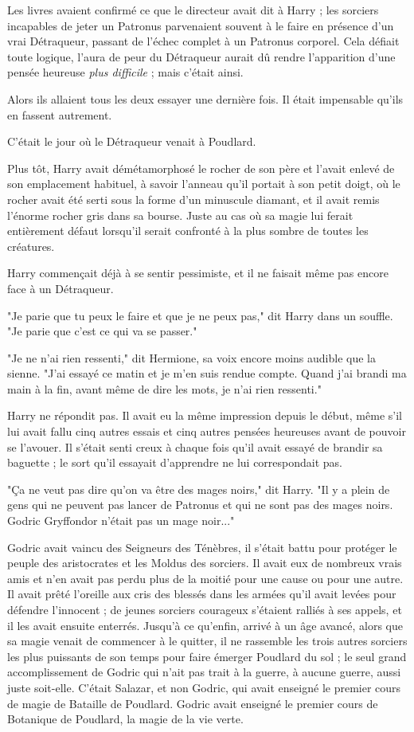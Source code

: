 Les livres avaient confirmé ce que le directeur avait dit à Harry ; les sorciers incapables de jeter un Patronus parvenaient souvent à le faire en présence d'un vrai Détraqueur, passant de l'échec complet à un Patronus corporel. Cela défiait toute logique, l'aura de peur du Détraqueur aurait dû rendre l'apparition d'une pensée heureuse \emph{plus difficile}  ; mais c'était ainsi.

Alors ils allaient tous les deux essayer une dernière fois. Il était impensable qu'ils en fassent autrement.

C'était le jour où le Détraqueur venait à Poudlard.

Plus tôt, Harry avait démétamorphosé le rocher de son père et l'avait enlevé de son emplacement habituel, à savoir l'anneau qu'il portait à son petit doigt, où le rocher avait été serti sous la forme d'un minuscule diamant, et il avait remis l'énorme rocher gris dans sa bourse. Juste au cas où sa magie lui ferait entièrement défaut lorsqu'il serait confronté à la plus sombre de toutes les créatures.

Harry commençait déjà à se sentir pessimiste, et il ne faisait même pas encore face à un Détraqueur.

"Je parie que tu peux le faire et que je ne peux pas," dit Harry dans un souffle. "Je parie que c'est ce qui va se passer."

"Je ne n'ai rien ressenti," dit Hermione, sa voix encore moins audible que la sienne. "J'ai essayé ce matin et je m'en suis rendue compte. Quand j'ai brandi ma main à la fin, avant même de dire les mots, je n'ai rien ressenti."

Harry ne répondit pas. Il avait eu la même impression depuis le début, même s'il lui avait fallu cinq autres essais et cinq autres pensées heureuses avant de pouvoir se l'avouer. Il s'était senti creux à chaque fois qu'il avait essayé de brandir sa baguette ; le sort qu'il essayait d'apprendre ne lui correspondait pas.

"Ça ne veut pas dire qu'on va être des mages noirs," dit Harry. "Il y a plein de gens qui ne peuvent pas lancer de Patronus et qui ne sont pas des mages noirs. Godric Gryffondor n'était pas un mage noir..."

Godric avait vaincu des Seigneurs des Ténèbres, il s'était battu pour protéger le peuple des aristocrates et les Moldus des sorciers. Il avait eux de nombreux vrais amis et n'en avait pas perdu plus de la moitié pour une cause ou pour une autre. Il avait prêté l'oreille aux cris des blessés dans les armées qu'il avait levées pour défendre l'innocent ; de jeunes sorciers courageux s'étaient ralliés à ses appels, et il les avait ensuite enterrés. Jusqu'à ce qu'enfin, arrivé à un âge avancé, alors que sa magie venait de commencer à le quitter, il ne rassemble les trois autres sorciers les plus puissants de son temps pour faire émerger Poudlard du sol ; le seul grand accomplissement de Godric qui n'ait pas trait à la guerre, à aucune guerre, aussi juste soit-elle. C'était Salazar, et non Godric, qui avait enseigné le premier cours de magie de Bataille de Poudlard. Godric avait enseigné le premier cours de Botanique de Poudlard, la magie de la vie verte.

